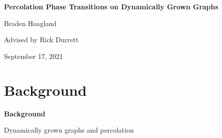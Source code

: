 \documentclass{beamer}
\begin{document}
{
\begin{frame}
	\bfseries
	{\color{white}
		\huge Percolation Phase Transitions on Dynamically Grown Graphs
	}
	\vspace{5mm}

	{\color{myblue}
		\large Braden Hoagland

		Advised by Rick Durrett
	}

	\vspace*{\fill}
	{\color{white}
		\small September 17, 2021
	}
\end{frame}
}

\section{Background}

{
\begin{frame}
        \bfseries
        {\color{white}
                \huge Background
        }
        \vspace{5mm}

	{\color{myblue}
		Dynamically grown graphs and percolation
	}
\end{frame}
}
\end{document}
